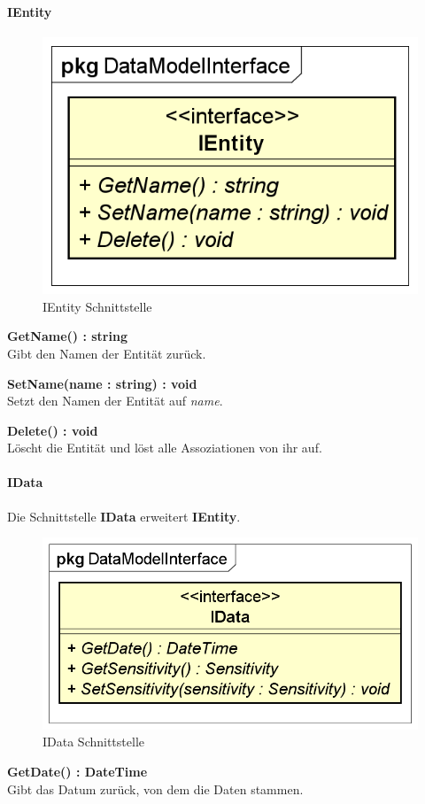 \documentclass[a4paper]{scrreprt}
\begin{document}
\paragraph{IEntity}
\begin{figure}[H]
\centering
\includegraphics[width=0.75\textheight]{graphics/Klassendiagramme/Model/IEntity.png}
\caption{IEntity Schnittstelle}
\end{figure}
\textbf{GetName() : string}\\
Gibt den Namen der Entität zurück.

\textbf{SetName(name : string) : void}\\
Setzt den Namen der Entität auf \textit{name}.

\textbf{Delete() : void}\\
Löscht die Entität und löst alle Assoziationen von ihr auf.

\paragraph{IData}
Die Schnittstelle \textbf{IData} erweitert \textbf{IEntity}.

\begin{figure}[H]
\centering
\includegraphics[width=0.75\textheight]{graphics/Klassendiagramme/Model/IData.png}
\caption{IData Schnittstelle}
\end{figure}
\textbf{GetDate() : DateTime}\\
Gibt das Datum zurück, von dem die Daten stammen.
\end{document}
